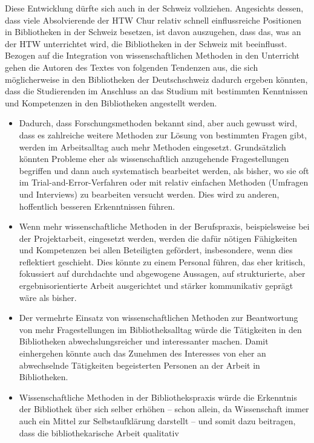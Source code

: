 \documentclass[a4paper,
fontsize=11pt,
oneside,
numbers=noperiodatend,
parskip=half-,
bibliography=totoc,
final
]{scrartcl}
\begin{document}
Diese Entwicklung dürfte sich auch in der Schweiz vollziehen. Angesichts
dessen, dass viele Absolvierende der HTW Chur relativ schnell
einflussreiche Positionen in Bibliotheken in der Schweiz besetzen, ist
davon auszugehen, dass das, was an der HTW unterrichtet wird, die
Bibliotheken in der Schweiz mit beeinflusst. Bezogen auf die Integration
von wissenschaftlichen Methoden in den Unterricht gehen die Autoren des
Textes von folgenden Tendenzen aus, die sich möglicherweise in den
Bibliotheken der Deutschschweiz dadurch ergeben könnten, dass die
Studierenden im Anschluss an das Studium mit bestimmten Kenntnissen und
Kompetenzen in den Bibliotheken angestellt werden.

\begin{itemize}
\item
  Dadurch, dass Forschungsmethoden bekannt sind, aber auch gewusst wird,
  dass es zahlreiche weitere Methoden zur Lösung von bestimmten Fragen
  gibt, werden im Arbeitsalltag auch mehr Methoden eingesetzt.
  Grundsätzlich könnten Probleme eher als wissenschaftlich anzugehende
  Fragestellungen begriffen und dann auch systematisch bearbeitet
  werden, als bisher, wo sie oft im Trial-and-Error-Verfahren oder mit
  relativ einfachen Methoden (Umfragen und Interviews) zu bearbeiten
  versucht werden. Dies wird zu anderen, hoffentlich besseren
  Erkenntnissen führen.
\item
  Wenn mehr wissenschaftliche Methoden in der Berufspraxis,
  beispielsweise bei der Projektarbeit, eingesetzt werden, werden die
  dafür nötigen Fähigkeiten und Kompetenzen bei allen Beteiligten
  gefördert, insbesondere, wenn dies reflektiert geschieht. Dies könnte
  zu einem Personal führen, das eher kritisch, fokussiert auf
  durchdachte und abgewogene Aussagen, auf strukturierte, aber
  ergebnisorientierte Arbeit ausgerichtet und stärker kommunikativ
  geprägt wäre als bisher.
\item
  Der vermehrte Einsatz von wissenschaftlichen Methoden zur Beantwortung
  von mehr Fragestellungen im Bibliotheksalltag würde die Tätigkeiten in
  den Bibliotheken abwechslungsreicher und interessanter machen. Damit
  einhergehen könnte auch das Zunehmen des Interesses von eher an
  abwechselnde Tätigkeiten begeisterten Personen an der Arbeit in
  Bibliotheken.
\item
  Wissenschaftliche Methoden in der Bibliothekspraxis würde die
  Erkenntnis der Bibliothek über sich selber erhöhen -- schon allein, da
  Wissenschaft immer auch ein Mittel zur Selbstaufklärung darstellt --
  und somit dazu beitragen, dass die bibliothekarische Arbeit qualitativ

\end{itemize}
\end{document}
